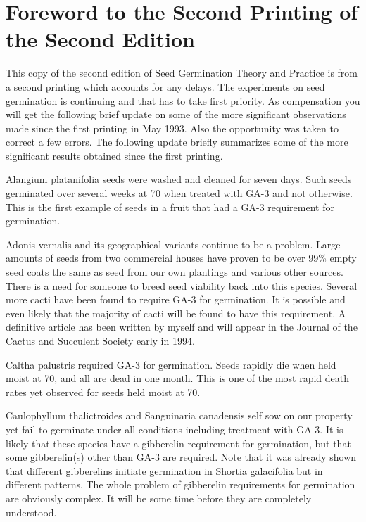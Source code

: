 \chapter*{Foreword to the Second Printing of the Second Edition}

This copy of the second edition of Seed Germination Theory and Practice is from
a second printing which accounts for any delays. The experiments on seed
germination is continuing and that has to take first priority. As compensation
you will get the following brief update on some of the more significant
observations made since the first printing in May 1993. Also the opportunity
was taken to correct a few errors. The following update briefly summarizes
some of the more significant results obtained since the first printing.

Alangium platanifolia seeds were washed and cleaned for seven days. Such seeds
germinated over several weeks at 70 when treated with GA-3 and not otherwise.
This is the first example of seeds in a fruit that had a GA-3 requirement for
germination.

Adonis vernalis and its geographical variants continue to be a problem. Large
amounts of seeds from two commercial houses have proven to be over 99\% empty
seed coats the same as seed from our own plantings and various other sources.
There is a need for someone to breed seed viability back into this species.
Several more cacti have been found to require GA-3 for germination. It is
possible and even likely that the majority of cacti will be found to have this
requirement. A definitive article has been written by myself and will appear in the
Journal of the Cactus and Succulent Society early in 1994.

Caltha palustris required GA-3 for germination. Seeds rapidly die when held
moist at 70, and all are dead in one month. This is one of the most rapid death rates
yet observed for seeds held moist at 70.

Caulophyllum thalictroides and Sanguinaria canadensis self sow on our property
yet fail to germinate under all conditions including treatment with GA-3. It is
likely that these species have a gibberelin requirement for germination, but
that some gibberelin(s) other than GA-3 are required. Note that it was already
shown that different gibberelins initiate germination in Shortia galacifolia
but in different patterns. The whole problem of gibberelin requirements for
germination are obviously complex. It will be some time before they are
completely understood.

